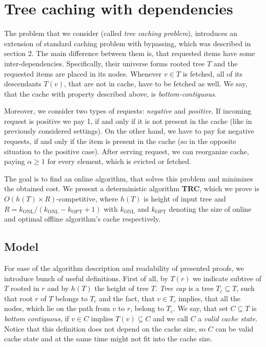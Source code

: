 \section{Tree caching with dependencies}
\label{tree_caching_algo}
The problem that we consider (called \textit{tree caching problem}), 
introduces an extension of standard caching problem with bypassing, 
which was described in section 2. The main difference between them is, that 
requested items have some inter-dependencies. Specifically, their 
universe forms rooted tree $T$ and the requested items are placed in its nodes. 
Whenever $v \in T$ is fetched, all of its descendants $T(v)$, that are not 
in cache, have to be fetched as well. We say, that the cache with property 
described above, is \textit{bottom-contiguous}.

Moreover, we consider two types of requests: \textit{negative} and 
\textit{positive}. If incoming request is positive we pay 1, if and only if 
it is not present in the cache (like in previously considered settings). On the 
other hand, we have to pay for negative requests, if and only if the item is 
present in the cache (so in the opposite situation to the positive case). After 
serving request, we can reorganize cache, paying $\alpha \geq 1$ for every 
element, which is evicted or fetched. 

The goal is to find an online algorithm, that solves this problem and minimizes 
the obtained cost. We present a deterministic algorithm \textbf{TRC}, which 
we prove is $O(h(T) \times R)$-competitive, where $h(T)$ is height of input tree 
and $R = k_{\mathrm{ONL}}/(k_{\mathrm{ONL}} - k_{\mathrm{OPT}} +1)$ with 
$k_{\mathrm{ONL}}$ and $k_{\mathrm{OPT}}$ denoting the size of 
online and optimal offline algorithm's cache respectively.

\subsection{Model}

For ease of the algorithm description and readability of presented proofs, 
we introduce bunch of useful definitions. First of all, by $T(r)$ we indicate 
subtree of $T$ rooted in $r$ and by $h(T)$ the height of tree $T$. 
\textit{Tree cap} is a tree $T_c \subseteq T$, such that root $r$ of $T$ belongs
to $T_c$ and the fact, that $v \in T_c$ 
implies, that all the nodes, which lie on the path from $v$ to $r$, belong to $T_c$. 
We say, that set $C \subseteq T$ is \textit{bottom contiguous}, if $v \in C$ implies 
$T(v) \subseteq C$ and we call $C$ a \textit{valid cache state}. Notice that this 
definition does not depend on the cache size, so $C$ can be valid cache state and at 
the same time might not fit into the cache size.

